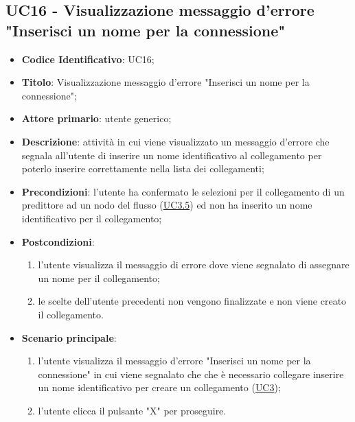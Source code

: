 	\subsection{UC16 - Visualizzazione messaggio d'errore "Inserisci un nome per la connessione"}
		\begin{itemize}
			\item\textbf{Codice Identificativo}: UC16;
			\item\textbf{Titolo}: Visualizzazione messaggio d'errore "Inserisci un nome per la connessione";
			\item\textbf{Attore primario}: utente generico;
			\item\textbf{Descrizione}: attività in cui viene visualizzato un messaggio d'errore che segnala all'utente di inserire un nome identificativo al collegamento per poterlo inserire correttamente nella lista dei collegamenti;
			\item\textbf{Precondizioni}: l'utente ha confermato le selezioni per il collegamento di un predittore ad un nodo del flusso (\hyperref[par:UC3.5]{UC3.5}) ed non ha inserito un nome identificativo per il collegamento;
			\item\textbf{Postcondizioni}:
				\begin{enumerate}
					\item l'utente visualizza il messaggio di errore dove viene segnalato di assegnare un nome per il collegamento;
					\item le scelte dell'utente precedenti non vengono finalizzate e non viene creato il collegamento.
				\end{enumerate}		
			\item\textbf{Scenario principale}:
				\begin{enumerate}
					\item l'utente visualizza il messaggio d'errore "Inserisci un nome per la connessione" in cui viene segnalato che che è necessario collegare inserire un nome identificativo per creare un collegamento (\hyperref[par:UC3]{UC3});
					\item l'utente clicca il pulsante "X" per proseguire.		
				\end{enumerate}		
		\end{itemize}


\label{par:UC17}
